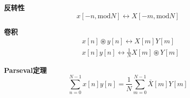 {\bf 反转性}
\[
x\left[ -n,\mathrm{mod}N \right] \leftrightarrow X\left[ -m,\mathrm{mod}N \right]
\]

{\bf 卷积}
\begin{align*}
&x\left[ n \right] \circledast y\left[ n \right] \leftrightarrow X\left[ m \right] Y\left[ m \right] \\
&x\left[ n \right] y\left[ n \right] \leftrightarrow \frac{1}{N}X\left[ m \right] \circledast Y\left[ m \right]
\end{align*}

{\bf Parseval定理}
\[
\sum_{n=0}^{N-1}{x\left[ n \right] y\left[ n \right]}=\frac{1}{N}\sum_{m=0}^{N-1}{\bar{X}\left[ m \right] Y\left[ m \right]}
\]




